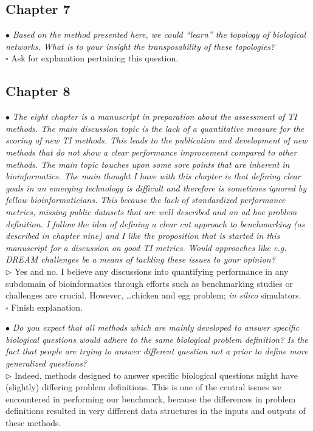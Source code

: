 \documentclass[10pt]{article}
\newcommand{\todo}{$\square$}
\newcommand{\exam}[2][\  ]{\hspace{0pt}\marginpar{\color{myred}#1}$\bullet$ \textit{#2}}
\newcommand{\nimp}[1]{{\color{mygray} #1}}
\newcommand{\answ}[1]{{\color{myblue} $\triangleright$ #1}}
\newcommand{\task}[2][\todo]{{\color{myblue} #1 #2}}
\begin{document}
\subsection{Chapter 7}

\exam{Based on the method presented here, we could “learn” the topology of biological
	networks. What is to your insight the transposability of these topologies?}\\
\task{Ask for explanation pertaining this question.}

\subsection{Chapter 8}
\exam{\nimp{The eight chapter is a manuscript in preparation about the assessment of TI methods. The main discussion topic is the lack of a quantitative measure for the scoring of new TI methods. This leads to the publication and development of new methods that do not show a clear performance improvement compared to other methods. The main topic touches
		upon some sore points that are inherent in bioinformatics. The main thought I have with
		this chapter is that defining clear goals in an emerging technology is difficult and therefore is sometimes ignored by fellow bioinformaticians. This because the lack of standardized performance metrics, missing public datasets that are well described and an \textit{ad hoc} problem definition. I follow the idea of defining a clear cut approach to benchmarking (as described in chapter nine) and I like the proposition that is started in this manuscript for a discussion on good TI metrics.} Would approaches like e.g. DREAM challenges be a means of tackling these issues to your opinion?} \\
\answ{Yes and no. I believe any discussions into quantifying performance in any subdomain of bioinformatics through efforts such as benchmarking studies or challenges are crucial. However, \ldots chicken and egg problem; \textit{in silico} simulators.} \\
\task{Finish explanation.}

\exam{Do you expect that all methods which are mainly developed to answer specific
	biological questions would adhere to the same biological problem definition? Is the fact that people are trying to answer different question not a prior to define more generalized
	questions?} \\
\answ{Indeed, methods designed to answer specific biological questions might have (slightly) differing problem definitions. This is one of the central issues we encountered in performing our benchmark, because the differences in problem definitions resulted in very different data structures in the inputs and outputs of these methods.}
\end{document}
